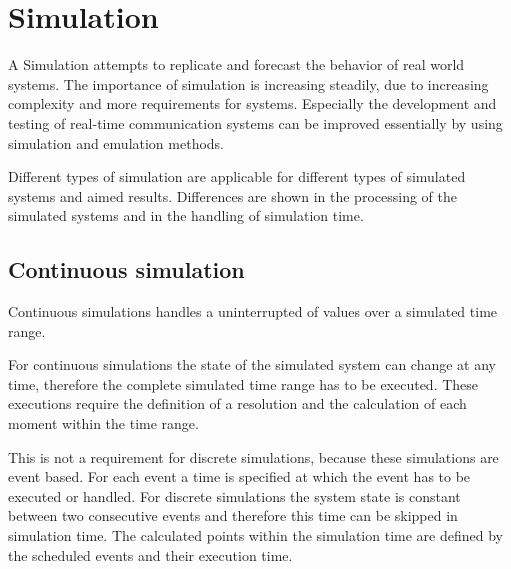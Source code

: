 \chapter{Simulation}
\label{cha:simulation}


A Simulation attempts to replicate and forecast the behavior of real world systems.
The importance of simulation is increasing steadily, due to increasing complexity and more requirements for systems.
Especially the development and testing of real-time communication systems can be improved essentially by using simulation and emulation methods.

Different types of simulation are applicable for different types of simulated systems and aimed results.
Differences are shown in the processing of the simulated systems and in the handling of simulation time.
\cite[section 1.2]{mchaney2009understanding}


\section{Continuous simulation}
\label{sec:simulation_cont}
Continuous simulations handles a uninterrupted of values over a simulated time range.

For continuous simulations the state of the simulated system can change at any time, therefore the complete simulated time range has to be executed.
These executions require the definition of a resolution and the calculation of each moment within the time range.

This is not a requirement for discrete simulations, because these simulations are event based.
For each event a time is specified at which the event has to be executed or handled.
For discrete simulations the system state is constant between two consecutive events and therefore this time can be skipped in simulation time.
The calculated points within the simulation time are defined by the scheduled events and their execution time.

